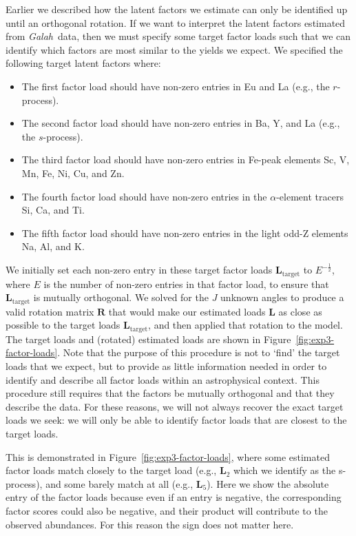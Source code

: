 \documentclass[twocolumn]{aastex62}
\newcommand{\project}[1]{\textsl{#1}}
\newcommand{\Galah}{\project{Galah}}
\newcommand{\vect}[1]{\boldsymbol{\mathbf{#1}}}
\renewcommand{\vec}[1]{\vect{#1}}
\newcommand{\factorloads}{\textbf{L}}
\newcommand{\NumLatentFactors}{J}
\begin{document}
Earlier we described how the latent factors we estimate can only be identified up until an orthogonal rotation. If we want to interpret the latent factors estimated from \Galah\ data, then we must specify
some target factor loads such that we can identify which factors are most similar to the yields we expect.
We specified the following target latent factors where:
\begin{itemize}
	\item The first factor load should have non-zero entries in Eu and La (e.g., the $r$-process).
	\item The second factor load should have non-zero entries in Ba, Y, and La (e.g., the $s$-process).
	\item The third factor load should have non-zero entries in Fe-peak elements Sc, V, Mn, Fe, Ni, Cu, and Zn.
	\item The fourth factor load should have non-zero entries in the $\alpha$-element tracers Si, Ca, and Ti.
	\item The fifth factor load should have non-zero entries in the light odd-Z elements Na, Al, and K.
\end{itemize}

We initially set each non-zero entry in these target factor loads $\factorloads_\textrm{target}$ to $E^{-\frac{1}{2}}$, where $E$ is the number of non-zero entries in that factor load, to ensure that $\factorloads_\textrm{target}$ is mutually orthogonal.
We solved for the $\NumLatentFactors$ unknown angles to produce a valid rotation matrix $\vec{R}$ that would make our estimated loads $\factorloads$ as close as possible to the target loads $\factorloads_\textrm{target}$, and then applied that rotation to the model. The target loads and (rotated) estimated loads are shown in Figure~\ref{fig:exp3-factor-loads}. Note that the purpose of this procedure is not to `find' the target loads that we expect, but to provide as little information needed in order to identify and describe all factor loads within an astrophysical context. This procedure still requires that the factors be mutually orthogonal and that they describe the data. For these reasons, we will not always recover the exact target loads we seek: we will only be able to identify factor loads that are closest to the target loads.

This is demonstrated in Figure~\ref{fig:exp3-factor-loads}, where some estimated factor loads match
closely to the target load (e.g., $\mathbf{L}_2$ which we identify as the s-process), and some barely
match at all (e.g., $\mathbf{L}_5$). Here we show the absolute entry of the factor loads because even
if an entry is negative, the corresponding factor scores could also be negative, and their product will contribute to the observed abundances. For this reason the sign does not matter here.
\end{document}
